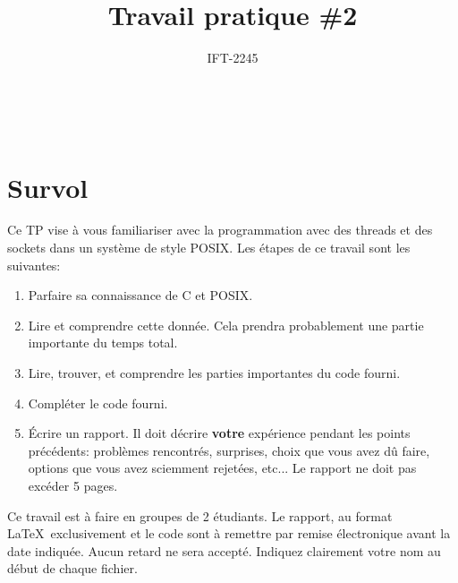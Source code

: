 \documentclass{article}
\title{Travail pratique \#2}
\author{IFT-2245}
\begin{document}
\maketitle

{\centering {} \\}

\newcommand \mML {\ensuremath\mu\textsl{ML}}
\newcommand \kw [1] {\textsf{#1}}
\newcommand \id [1] {\textsl{#1}}
\newcommand \punc [1] {\kw{`#1'}}
\newcommand \str [1] {\texttt{"#1"}}
\newenvironment{outitemize}{
  \begin{itemize}
  \let \origitem \item \def \item {\origitem[]\hspace{-18pt}}
}{
  \end{itemize}
}

\section{Survol}

Ce TP vise à vous familiariser avec la programmation avec des threads et des
sockets dans un système de style POSIX.
Les étapes de ce travail sont les suivantes:
\begin{enumerate}
\item Parfaire sa connaissance de C et POSIX.
\item Lire et comprendre cette donnée.  Cela prendra probablement une partie
  importante du temps total.
\item Lire, trouver, et comprendre les parties importantes du code fourni.
\item Compléter le code fourni.
\item Écrire un rapport.  Il doit décrire \textbf{votre} expérience pendant
  les points précédents: problèmes rencontrés, surprises, choix que vous
  avez dû faire, options que vous avez sciemment rejetées, etc...  Le
  rapport ne doit pas excéder 5 pages.
\end{enumerate}

Ce travail est à faire en groupes de 2 étudiants.  Le rapport, au format
\LaTeX\ exclusivement et le code sont
à remettre par remise électronique avant la date indiquée.  Aucun retard ne
sera accepté.  Indiquez clairement votre nom au début de chaque fichier.
\end{document}
